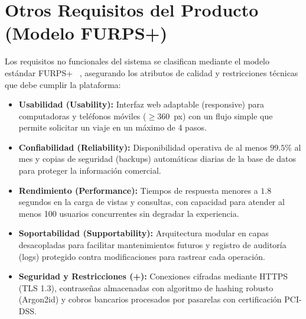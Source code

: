 \section{Otros Requisitos del Producto (Modelo FURPS+)}
Los requisitos no funcionales del sistema se clasifican mediante el modelo estándar FURPS+~\cite{pressman2015} %
, asegurando los atributos de calidad y restricciones técnicas que debe cumplir la plataforma: 
\begin{itemize}
    \item \textbf{Usabilidad (Usability):} Interfaz web adaptable (responsive) para computadoras y teléfonos móviles ($\ge 360$\, px) con un flujo simple que permite solicitar un viaje en un máximo de 4 pasos.
    \item \textbf{Confiabilidad (Reliability):} Disponibilidad operativa de al menos $99.5\%$ al mes y copias de seguridad (backups) automáticas diarias de la base de datos para proteger la información comercial.
    \item \textbf{Rendimiento (Performance):} Tiempos de respuesta menores a $1.8$ segundos en la carga de vistas y consultas, con capacidad para atender al menos 100 usuarios concurrentes sin degradar la experiencia.
    \item \textbf{Soportabilidad (Supportability):} Arquitectura modular en capas desacopladas para facilitar mantenimientos futuros y registro de auditoría (logs) protegido contra modificaciones para rastrear cada operación.
    \item \textbf{Seguridad y Restricciones (+):} Conexiones cifradas mediante HTTPS (TLS 1.3), contraseñas almacenadas con algoritmo de hashing robusto (Argon2id) y cobros bancarios procesados por pasarelas con certificación PCI-DSS.
\end{itemize}
